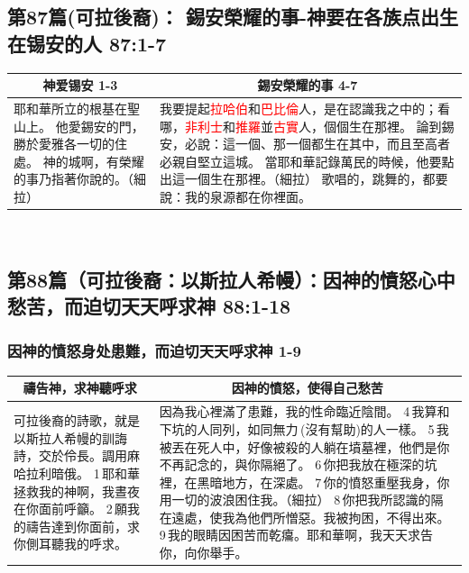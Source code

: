 \subsection{第87篇(可拉後裔)： 錫安榮耀的事-神要在各族点出生在锡安的人 87:1-7}
\begin{table}[H]
\centering
\begin{tabular}{p{5.25cm}|p{12.00cm}}\hline\hline
\multicolumn{1}{c|}{神爱锡安 1-3}&\multicolumn{1}{c}{錫安榮耀的事 4-7}\\\hline
耶和華所立的根基在聖山上。
他愛錫安的門，勝於愛雅各一切的住處。
神的城啊，有榮耀的事乃指著你說的。（細拉）
&我要提起\textcolor{red}{拉哈伯}和\textcolor{red}{巴比倫}人，是在認識我之中的；看哪，\textcolor{red}{非利士}和\textcolor{red}{推羅}並\textcolor{red}{古實}人，個個生在那裡。
論到錫安，必說：這一個、那一個都生在其中，而且至高者必親自堅立這城。
當耶和華記錄萬民的時候，他要點出這一個生在那裡。（細拉）
歌唱的，跳舞的，都要說：我的泉源都在你裡面。\\\hline
\end{tabular}
\end{table} 

\subsection{第88篇（可拉後裔：以斯拉人希幔）：因神的憤怒心中愁苦，而迫切天天呼求神  88:1-18}
\subsubsection{因神的憤怒身处患難，而迫切天天呼求神 1-9}
\begin{table}[H]
\centering
\begin{tabular}{p{4.75cm}|p{12.00cm}}\hline\hline
\multicolumn{1}{c|}{禱告神，求神聽呼求}&\multicolumn{1}{c}{因神的憤怒，使得自己愁苦}\\\hline
可拉後裔的詩歌，就是以斯拉人希幔的訓誨詩，交於伶長。調用麻哈拉利暗俄。
1 耶和華拯救我的神啊，我晝夜在你面前呼籲。
2 願我的禱告達到你面前，求你側耳聽我的呼求。
&因為我心裡滿了患難，我的性命臨近陰間。
4 我算和下坑的人同列，如同無力 (沒有幫助)的人一樣。
5 我被丟在死人中，好像被殺的人躺在墳墓裡，他們是你不再記念的，與你隔絕了。
6 你把我放在極深的坑裡，在黑暗地方，在深處。
7 你的憤怒重壓我身，你用一切的波浪困住我。（細拉）
8 你把我所認識的隔在遠處，使我為他們所憎惡。我被拘困，不得出來。
9 我的眼睛因困苦而乾癟。耶和華啊，我天天求告你，向你舉手。\\\hline
\end{tabular}
\end{table} 

